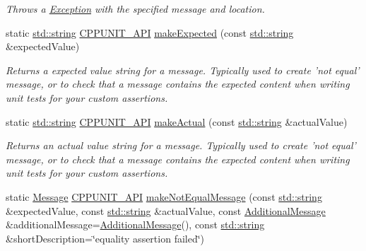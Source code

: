 \begin{DoxyCompactItemize}
\begin{DoxyCompactList}\small\item\em Throws a \hyperlink{class_exception}{Exception} with the specified message and location. \end{DoxyCompactList}\item 
static \hyperlink{glew_8h_ae84541b4f3d8e1ea24ec0f466a8c568b}{std\-::string} \hyperlink{_cpp_unit_api_8h_a0a4ad180f07bc3823bae0e453718ef6a}{C\-P\-P\-U\-N\-I\-T\-\_\-\-A\-P\-I} \hyperlink{struct_asserter_adcbee7c01d58bfaee72cc984627e6432}{make\-Expected} (const \hyperlink{glew_8h_ae84541b4f3d8e1ea24ec0f466a8c568b}{std\-::string} \&expected\-Value)
\begin{DoxyCompactList}\small\item\em Returns a expected value string for a message. Typically used to create 'not equal' message, or to check that a message contains the expected content when writing unit tests for your custom assertions. \end{DoxyCompactList}\item 
static \hyperlink{glew_8h_ae84541b4f3d8e1ea24ec0f466a8c568b}{std\-::string} \hyperlink{_cpp_unit_api_8h_a0a4ad180f07bc3823bae0e453718ef6a}{C\-P\-P\-U\-N\-I\-T\-\_\-\-A\-P\-I} \hyperlink{struct_asserter_ae52920ca7ffd981df61d7a3cfd88793b}{make\-Actual} (const \hyperlink{glew_8h_ae84541b4f3d8e1ea24ec0f466a8c568b}{std\-::string} \&actual\-Value)
\begin{DoxyCompactList}\small\item\em Returns an actual value string for a message. Typically used to create 'not equal' message, or to check that a message contains the expected content when writing unit tests for your custom assertions. \end{DoxyCompactList}\item 
static \hyperlink{class_message}{Message} \hyperlink{_cpp_unit_api_8h_a0a4ad180f07bc3823bae0e453718ef6a}{C\-P\-P\-U\-N\-I\-T\-\_\-\-A\-P\-I} \hyperlink{struct_asserter_adb8ac36c8f0d385430e5a087a66219db}{make\-Not\-Equal\-Message} (const \hyperlink{glew_8h_ae84541b4f3d8e1ea24ec0f466a8c568b}{std\-::string} \&expected\-Value, const \hyperlink{glew_8h_ae84541b4f3d8e1ea24ec0f466a8c568b}{std\-::string} \&actual\-Value, const \hyperlink{class_additional_message}{Additional\-Message} \&additional\-Message=\hyperlink{class_additional_message}{Additional\-Message}(), const \hyperlink{glew_8h_ae84541b4f3d8e1ea24ec0f466a8c568b}{std\-::string} \&short\-Description=\char`\"{}equality assertion failed\char`\"{})
\item 

\end{DoxyCompactItemize}
